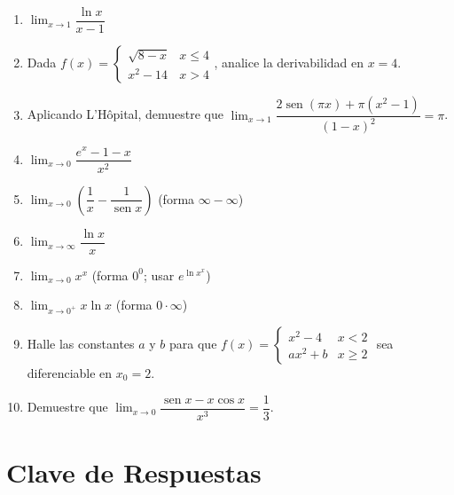 \documentclass[12pt, letterpaper]{article}
\begin{document}
\begin{enumerate}[leftmargin=*]
  \item \dificil{} $\lim_{x\to1}\dfrac{\ln x}{x - 1}$

  \item \dificil{} Dada $f(x) = \begin{cases} \sqrt{8-x} & x \le 4 \\ x^2 - 14 & x > 4 \end{cases}$, analice la derivabilidad en $x=4$. %

  \item \muyDificil{} Aplicando L'Hôpital, demuestre que $\lim_{x\to1}\dfrac{2\operatorname{sen}(\pi x) + \pi(x^2-1)}{(1-x)^2} = \pi$. %

  \item \muyDificil{} $\lim_{x\to0}\dfrac{e^x - 1 - x}{x^2}$

  \item \muyDificil{} $\lim_{x\to0}\left(\dfrac{1}{x} - \dfrac{1}{\operatorname{sen} x}\right)$ (forma $\infty - \infty$)

  \item \muyDificil{} $\lim_{x\to\infty}\dfrac{\ln x}{x}$

  \item \muyDificil{} $\lim_{x\to0}x^x$ (forma $0^0$; usar $e^{\ln x^x}$)

  \item \muyDificil{} $\lim_{x\to0^+}x\ln x$ (forma $0\cdot\infty$)

  \item \muyDificil{} Halle las constantes $a$ y $b$ para que $f(x) = \begin{cases} x^2 - 4 & x < 2 \\ ax^2 + b & x \ge 2 \end{cases}$ sea diferenciable en $x_0 = 2$. %

  \item \muyDificil{} Demuestre que $\lim_{x\to0}\dfrac{\operatorname{sen} x - x\cos x}{x^3} = \dfrac{1}{3}$.

\end{enumerate}

\newpage
\ifmwclaves
  \section{Clave de Respuestas}
\end{document}
